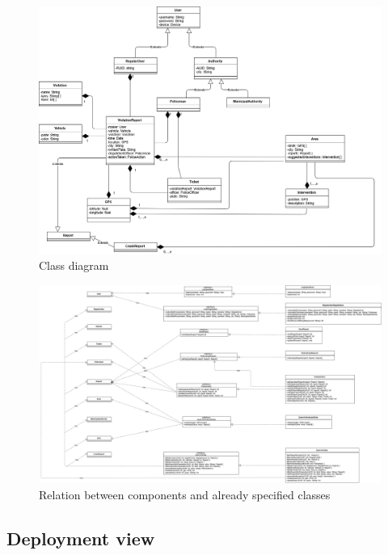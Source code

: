 \begin{figure}[h!]
	\centering
	\includegraphics[angle=90, scale=0.40]{Images/ADV_class_diagram}
	\caption{Class diagram}
\end{figure}
\newpage

\begin{figure}[h!]
	\centering
	\includegraphics[angle=90, scale=0.28]{Images/component_class_relation}
	\caption{Relation between components and already specified classes}
\end{figure}
\newpage
\subsection{Deployment view}

